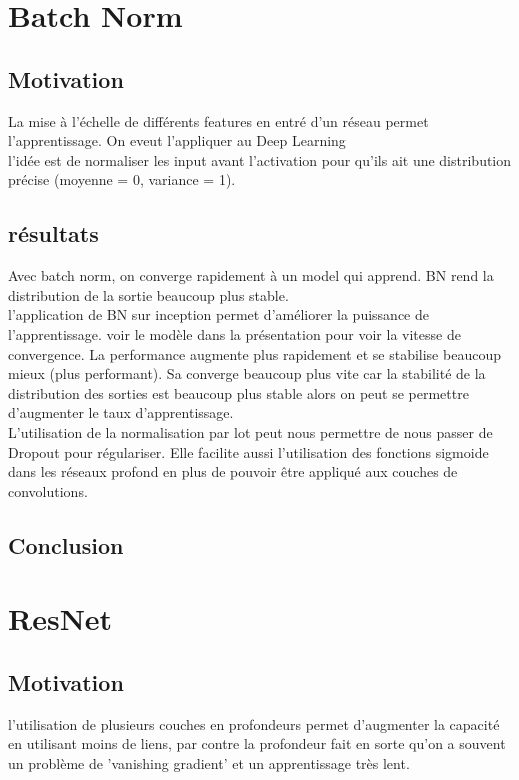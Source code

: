 \documentclass[oneside]{book}
\begin{document}
\section{Batch Norm}
\subsection{Motivation}
La mise à l'échelle de différents features en entré d'un réseau permet l'apprentissage. On eveut l'appliquer au Deep Learning\\

l'idée est de normaliser les input avant l'activation pour qu'ils ait une distribution précise (moyenne = 0, variance = 1). 

\subsection{résultats}
Avec batch norm, on converge rapidement à un model qui apprend. BN rend la distribution de la sortie beaucoup plus stable. \\

l'application de BN sur inception permet d'améliorer la puissance de l'apprentissage. voir le modèle dans la présentation pour voir la vitesse de convergence. La performance augmente plus rapidement et se stabilise beaucoup mieux (plus performant). Sa converge beaucoup plus vite car la stabilité de la distribution des sorties est beaucoup plus stable alors on peut se permettre d'augmenter le taux d'apprentissage.\\

L'utilisation de la normalisation par lot peut nous permettre de nous passer de Dropout pour régulariser. Elle facilite aussi l'utilisation des fonctions sigmoide dans les réseaux profond en plus de pouvoir être appliqué aux couches de convolutions.

\subsection{Conclusion}

\section{ResNet}

\subsection{Motivation}
l'utilisation de plusieurs couches en profondeurs permet d'augmenter la capacité en utilisant moins de liens, par contre la profondeur fait en sorte qu'on a souvent un problème de 'vanishing gradient' et un apprentissage très lent.\\
\end{document}
